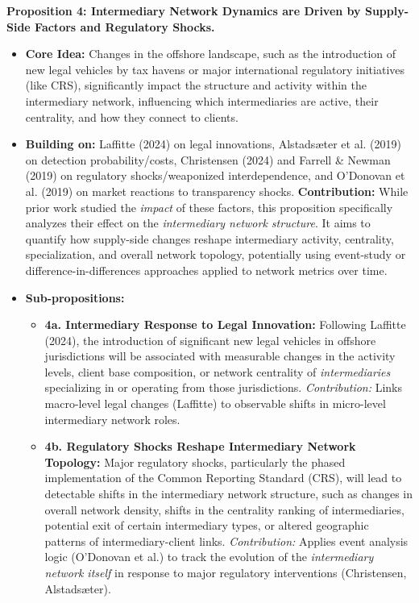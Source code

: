 \textbf{Proposition 4: Intermediary Network Dynamics are Driven by Supply-Side Factors and Regulatory Shocks.}
\begin{itemize}[leftmargin=*]
    \item \textbf{Core Idea:} Changes in the offshore landscape, such as the introduction of new legal vehicles by tax havens or major international regulatory initiatives (like CRS), significantly impact the structure and activity within the intermediary network, influencing which intermediaries are active, their centrality, and how they connect to clients.
    \item \textbf{Building on:} Laffitte (2024) on legal innovations, Alstadsæter et al. (2019) on detection probability/costs, Christensen (2024) and Farrell \& Newman (2019) on regulatory shocks/weaponized interdependence, and O'Donovan et al. (2019) on market reactions to transparency shocks.
    \textbf{Contribution:} While prior work studied the \textit{impact} of these factors, this proposition specifically analyzes their effect on the \textit{intermediary network structure}. It aims to quantify how supply-side changes reshape intermediary activity, centrality, specialization, and overall network topology, potentially using event-study or difference-in-differences approaches applied to network metrics over time.
    \item \textbf{Sub-propositions:}
    \begin{itemize}[leftmargin=\parindent]
        \item \textbf{4a. Intermediary Response to Legal Innovation:} Following Laffitte (2024), the introduction of significant new legal vehicles in offshore jurisdictions will be associated with measurable changes in the activity levels, client base composition, or network centrality of \textit{intermediaries} specializing in or operating from those jurisdictions. \textit{Contribution:} Links macro-level legal changes (Laffitte) to observable shifts in micro-level intermediary network roles.
        \item \textbf{4b. Regulatory Shocks Reshape Intermediary Network Topology:} Major regulatory shocks, particularly the phased implementation of the Common Reporting Standard (CRS), will lead to detectable shifts in the intermediary network structure, such as changes in overall network density, shifts in the centrality ranking of intermediaries, potential exit of certain intermediary types, or altered geographic patterns of intermediary-client links. \textit{Contribution:} Applies event analysis logic (O'Donovan et al.) to track the evolution of the \textit{intermediary network itself} in response to major regulatory interventions (Christensen, Alstadsæter).

\end{itemize}
\end{itemize}
